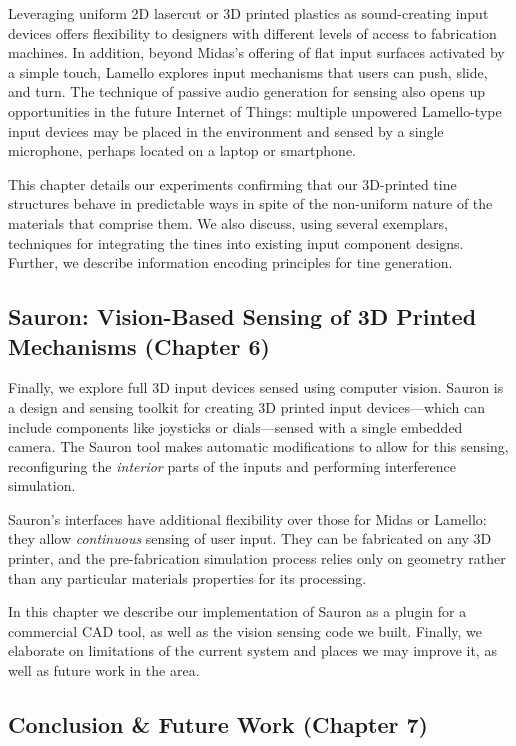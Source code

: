Leveraging uniform 2D lasercut or 3D printed plastics as sound-creating input devices offers flexibility to designers with different levels of access to fabrication machines. In addition, beyond Midas's offering of flat input surfaces activated by a simple touch, Lamello explores input mechanisms that users can push, slide, and turn. The technique of passive audio generation for sensing also opens up opportunities in the future Internet of Things: multiple unpowered Lamello-type input devices may be placed in the environment and sensed by a single microphone, perhaps located on a laptop or smartphone.

This chapter details our experiments confirming that our 3D-printed tine structures behave in predictable ways in spite of the non-uniform nature of the materials that comprise them. We also discuss, using several exemplars, techniques for integrating the tines into existing input component designs. Further, we describe information encoding principles for tine generation.

\subsection{Sauron: Vision-Based Sensing of 3D Printed Mechanisms (Chapter 6)}

Finally, we explore full 3D input devices sensed using computer vision. Sauron is a design and sensing toolkit for creating 3D printed input devices---which can include components like joysticks or dials---sensed with a single embedded camera. The Sauron tool makes automatic modifications to allow for this sensing, reconfiguring the \emph{interior} parts of the inputs and performing interference simulation.

Sauron's interfaces have additional flexibility over those for Midas or Lamello: they allow \emph{continuous} sensing of user input. They can be fabricated on any 3D printer, and the pre-fabrication simulation process relies only on geometry rather than any particular materials properties for its processing. 

In this chapter we describe our implementation of Sauron as a plugin for a commercial CAD tool, as well as the vision sensing code we built. Finally, we elaborate on limitations of the current system and places we may improve it, as well as future work in the area.

\subsection{Conclusion \& Future Work (Chapter 7)}

